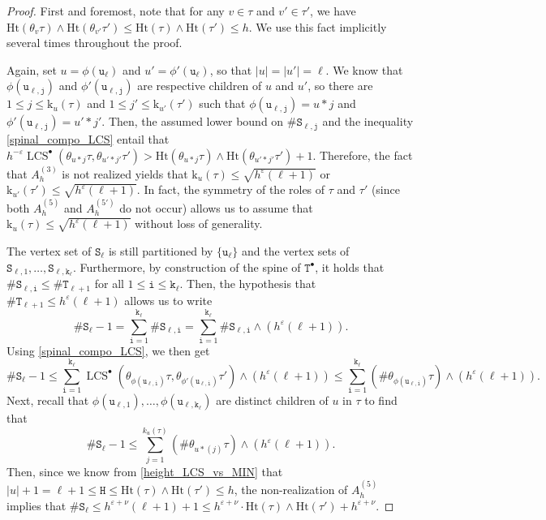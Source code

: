 \documentclass[11pt,reqno]{amsart}
\newcommand{\1}{\mathbf{1}}
\newcommand{\0}{\mathbf{0}}
\newcommand{\ttS}{\mathtt{S}}
\newcommand{\ttT}{\mathtt{T}}
\newcommand{\ttH}{\mathtt{H}}
\newcommand{\tti}{\mathtt{i}}
\newcommand{\ttj}{\mathtt{j}}
\newcommand{\ttk}{\mathtt{k}}
\newcommand{\ttu}{\mathtt{u}}
\newcommand{\Ht}{\mathrm{Ht}}
\newcommand{\rk}{\mathrm{k}}
\newcommand{\LCS}{\operatorname{LCS}}
\newcommand{\eps}{\varepsilon}
\begin{document}
\begin{proof}
First and foremost, note that for any $v\in\tau$ and $v'\in\tau'$, we have $\Ht(\theta_v\tau)\wedge \Ht(\theta_{v'}\tau')\leq \Ht(\tau)\wedge\Ht(\tau')\leq h$. We use this fact implicitly several times throughout the proof.

Again, set $u=\phi(\ttu_\ell)$ and $u'=\phi'(\ttu_\ell)$, so that $|u|=|u'|=\ell$. We know that $\phi(\ttu_{\ell,\ttj})$ and $\phi'(\ttu_{\ell,\ttj})$ are respective children of $u$ and $u'$, so there are $1\leq j\leq \rk_u(\tau)$ and $1\leq j'\leq \rk_{u'}(\tau')$ such that $\phi(\ttu_{\ell,\ttj})=u*j$ and $\phi'(\ttu_{\ell,\ttj})=u'*j'$. Then, the assumed lower bound on $\#\ttS_{\ell,\ttj}$ and the inequality \eqref{spinal_compo_LCS} entail that $h^{-\varepsilon}\LCS^\bullet(\theta_{u*j}\tau,\theta_{u'*j'}\tau')>  \Ht(\theta_{u*j}\tau)\wedge \Ht(\theta_{u'*j'}\tau')+1$. Therefore, the fact that $A_h^{(3)}$ is not realized yields that $\rk_u(\tau)\leq \sqrt{h^\varepsilon(\ell+1)}$ or $\rk_{u'}(\tau')\leq \sqrt{h^\varepsilon(\ell+1)}$. In fact, the symmetry of the roles of $\tau$ and $\tau'$ (since both $A_h^{(5)}$ and $A_h^{(5')}$ do not occur) allows us to assume that $\rk_u(\tau)\leq\sqrt{h^\varepsilon(\ell+1)}$ without loss of generality.

The vertex set of $\ttS_\ell$ is still partitioned by $\{\ttu_\ell\}$ and the vertex sets of $\ttS_{\ell,1},\ldots,\ttS_{\ell,\ttk_\ell}$. Furthermore, by construction of the spine of $\ttT^\bullet$, it holds that $\#\ttS_{\ell,\tti}\leq \#\ttT_{\ell+1}$ for all $1\leq\tti\leq\ttk_\ell$. Then, the hypothesis that $\#\ttT_{\ell+1}\leq h^\varepsilon(\ell+1)$ allows us to write
\[\#\ttS_\ell-1= \sum_{\tti=1}^{\ttk_\ell}\#\ttS_{\ell,\tti}=\sum_{\tti=1}^{\ttk_\ell}\#\ttS_{\ell,\tti}\wedge (h^\varepsilon(\ell+1)).\]
Using \eqref{spinal_compo_LCS}, we then get
\[\#\ttS_\ell-1\leq \sum_{\tti=1}^{\ttk_\ell}\LCS^\bullet(\theta_{\phi(\ttu_{\ell,\tti})}\tau,\theta_{\phi'(\ttu_{\ell,\tti})}\tau')\wedge(h^\varepsilon(\ell+1)) \leq \sum_{\tti=1}^{\ttk_\ell}(\#\theta_{\phi(\ttu_{\ell,\tti})}\tau)\wedge( h^\varepsilon(\ell+1)).\]
Next, recall that $\phi(\ttu_{\ell,1}),\ldots,\phi(\ttu_{\ell,\ttk_\ell})$ are distinct children of $u$ in $\tau$ to find that
\[\#\ttS_\ell-1\leq \sum_{j=1}^{k_u(\tau)}(\#\theta_{u*(j)}\tau)\wedge( h^\varepsilon(\ell+1)).\]
Then, since we know from \eqref{height_LCS_vs_MIN} that $|u|+1=\ell+1\leq \ttH\leq \Ht(\tau)\wedge\Ht(\tau')\leq h$, the non-realization of $A_h^{(5)}$ implies that $\#\ttS_\ell\leq h^{\eps+\nu}(\ell+1)+1\leq h^{\eps+\nu}\cdot \Ht(\tau)\wedge\Ht(\tau')+h^{\varepsilon+\nu}$.
\end{proof}
\end{document}
